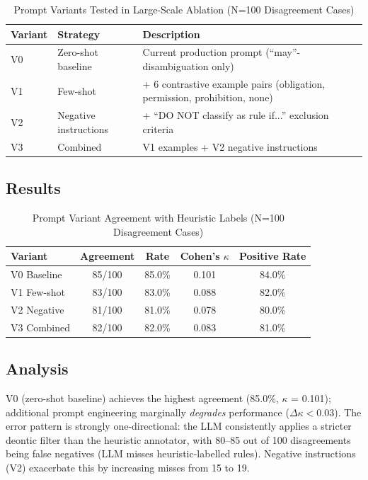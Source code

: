 \begin{table}[htbp]
\centering
\caption{Prompt Variants Tested in Large-Scale Ablation (N=100 Disagreement Cases)}
\label{tab:prompt-variants-large}
\begin{tabular}{llp{6.5cm}}
\toprule
\textbf{Variant} & \textbf{Strategy} & \textbf{Description} \\
\midrule
V0 & Zero-shot baseline & Current production prompt (``may''-disambiguation only) \\
V1 & Few-shot & + 6 contrastive example pairs (obligation, permission, prohibition, none) \\
V2 & Negative instructions & + ``DO NOT classify as rule if...'' exclusion criteria \\
V3 & Combined & V1 examples + V2 negative instructions \\
\bottomrule
\end{tabular}
\end{table}

\subsection{Results}

\begin{table}[htbp]
\centering
\caption{Prompt Variant Agreement with Heuristic Labels (N=100 Disagreement Cases)}
\label{tab:prompt-ablation-large-results}
\begin{tabular}{lcccc}
\toprule
\textbf{Variant} & \textbf{Agreement} & \textbf{Rate} & \textbf{Cohen's $\kappa$} & \textbf{Positive Rate} \\
\midrule
V0 Baseline  & 85/100 & 85.0\% & 0.101 & 84.0\% \\
V1 Few-shot  & 83/100 & 83.0\% & 0.088 & 82.0\% \\
V2 Negative  & 81/100 & 81.0\% & 0.078 & 80.0\% \\
V3 Combined  & 82/100 & 82.0\% & 0.083 & 81.0\% \\
\bottomrule
\end{tabular}
\end{table}

\subsection{Analysis}

V0 (zero-shot baseline) achieves the highest agreement (85.0\%, $\kappa$ = 0.101); additional prompt engineering marginally \textit{degrades} performance ($\Delta\kappa < 0.03$). The error pattern is strongly one-directional: the LLM consistently applies a stricter deontic filter than the heuristic annotator, with 80--85 out of 100 disagreements being false negatives (LLM misses heuristic-labelled rules). Negative instructions (V2) exacerbate this by increasing misses from 15 to 19.

